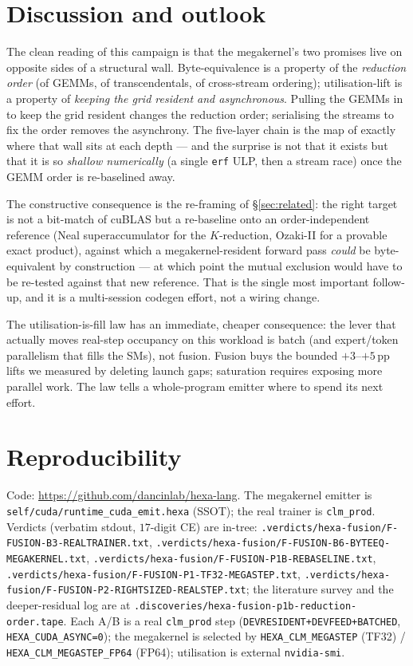 \documentclass[11pt,a4paper]{article}
\newcommand{\verdict}[1]{\texttt{.verdicts/hexa-fusion/#1}}
\begin{document}
\section{Discussion and outlook}
\label{sec:discussion}

The clean reading of this campaign is that the megakernel's two promises live
on opposite sides of a structural wall. Byte-equivalence is a property of the
\emph{reduction order} (of GEMMs, of transcendentals, of cross-stream
ordering); utilisation-lift is a property of \emph{keeping the grid resident
and asynchronous}. Pulling the GEMMs in to keep the grid resident changes the
reduction order; serialising the streams to fix the order removes the
asynchrony. The five-layer chain is the map of exactly where that wall sits at
each depth --- and the surprise is not that it exists but that it is so
\emph{shallow numerically} (a single \texttt{erf} ULP, then a stream race)
once the GEMM order is re-baselined away.

The constructive consequence is the re-framing of \S\ref{sec:related}: the
right target is not a bit-match of cuBLAS but a re-baseline onto an
order-independent reference (Neal superaccumulator for the $K$-reduction,
Ozaki-II for a provable exact product), against which a megakernel-resident
forward pass \emph{could} be byte-equivalent by construction --- at which
point the mutual exclusion would have to be re-tested against that new
reference. That is the single most important follow-up, and it is a
multi-session codegen effort, not a wiring change.

The utilisation-is-fill law has an immediate, cheaper consequence: the lever
that actually moves real-step occupancy on this workload is batch (and
expert/token parallelism that fills the SMs), not fusion. Fusion buys the
bounded $+3$--$+5$\,pp lifts we measured by deleting launch gaps; saturation
requires exposing more parallel work. The law tells a whole-program emitter
where to spend its next effort.

\section*{Reproducibility}

Code: \url{https://github.com/dancinlab/hexa-lang}. The megakernel emitter is
\texttt{self/cuda/runtime\_cuda\_emit.hexa} (SSOT); the real trainer is
\texttt{clm\_prod}. Verdicts (verbatim stdout, $17$-digit CE) are in-tree:
\verdict{F-FUSION-B3-REALTRAINER.txt},
\verdict{F-FUSION-B6-BYTEEQ-MEGAKERNEL.txt},
\verdict{F-FUSION-P1B-REBASELINE.txt},
\verdict{F-FUSION-P1-TF32-MEGASTEP.txt},
\verdict{F-FUSION-P2-RIGHTSIZED-REALSTEP.txt}; the literature survey and the
deeper-residual log are at
\texttt{.discoveries/hexa-fusion-p1b-reduction-order.tape}. Each A/B is a
real \texttt{clm\_prod} step (\texttt{DEVRESIDENT+DEVFEED+BATCHED},
\texttt{HEXA\_CUDA\_ASYNC=0}); the megakernel is selected by
\texttt{HEXA\_CLM\_MEGASTEP} (TF32) / \texttt{HEXA\_CLM\_MEGASTEP\_FP64}
(FP64); utilisation is external \texttt{nvidia-smi}.
\end{document}
